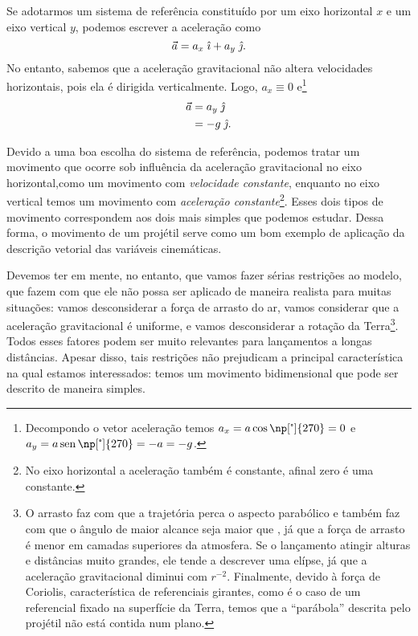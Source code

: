 Se adotarmos um sistema de referência constituído por um eixo horizontal $x$ e um eixo vertical $y$, podemos escrever a aceleração como
\begin{equation}
    \vec{a} = a_x \; \hat{\imath} + a_y \; \hat{\jmath}.
\end{equation}
%
No entanto, sabemos que a aceleração gravitacional não altera velocidades horizontais, pois ela é dirigida verticalmente. Logo, $a_x \equiv 0$ e\footnote{Decompondo o vetor aceleração temos $a_x = a \cos\np[\tcdegree]{270} = 0$ e $a_y = a \sen\np[\tcdegree]{270} = -a = -g$.}
\begin{align}
    \vec{a} &= a_y \; \hat{\jmath} \\
    &= -g \; \hat{\jmath}.
\end{align}

Devido a uma boa escolha do sistema de referência, podemos tratar um movimento que ocorre sob influência da aceleração gravitacional no eixo horizontal,como um movimento com \emph{velocidade constante}, enquanto no eixo vertical temos um movimento com \emph{aceleração constante}\footnote{No eixo horizontal a aceleração também é constante, afinal zero é uma constante.}. Esses dois tipos de movimento correspondem aos dois mais simples que podemos estudar. Dessa forma, o movimento de um projétil serve como um bom exemplo de aplicação da descrição vetorial das variáveis cinemáticas.

Devemos ter em mente, no entanto, que vamos fazer sérias restrições ao modelo, que fazem com que ele não possa ser aplicado de maneira realista para muitas situações: vamos desconsiderar a força de arrasto do ar, vamos considerar que a aceleração gravitacional é uniforme, e vamos desconsiderar a rotação da Terra\footnote{O arrasto faz com que a trajetória perca o aspecto parabólico e também faz com que o ângulo de maior alcance seja maior que , já que a força de arrasto é menor em camadas superiores da atmosfera. Se o lançamento atingir alturas e distâncias muito grandes, ele tende a descrever uma elípse, já que a aceleração gravitacional diminui com $r^{-2}$. Finalmente, devido à força de Coriolis, característica de referenciais girantes, como é o caso de um referencial fixado na superfície da Terra, temos que a ``parábola'' descrita pelo projétil não está contida num plano.}. Todos esses fatores podem ser muito relevantes para lançamentos a longas distâncias. Apesar disso, tais restrições não prejudicam a principal característica na qual estamos interessados: temos um movimento bidimensional que pode ser descrito de maneira simples.

